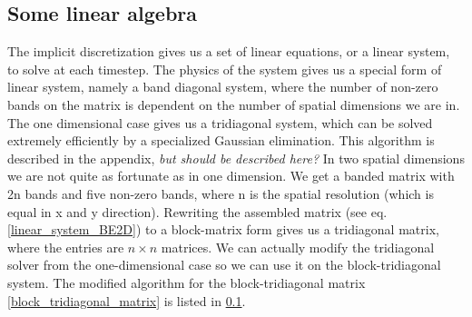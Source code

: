 \subsection{Some linear algebra}
The implicit discretization gives us a set of linear equations, or a linear system, to solve at each timestep. 
The physics of the system gives us a special form of linear system, namely a band diagonal system, where the number of non-zero bands on the matrix is dependent on the number of spatial dimensions we are in. 
The one dimensional case gives us a tridiagonal system, which can be solved extremely efficiently by a specialized Gaussian elimination. This algorithm is described in the appendix, \emph{but should be described here?} 
In two spatial dimensions we are not quite as fortunate as in one dimension. We get a banded matrix with 2n bands and five non-zero bands, where n is the spatial resolution (which is equal in x and y direction). Rewriting the assembled matrix (see eq. \ref{linear_system_BE2D}) to a block-matrix form gives us a tridiagonal matrix, where the entries are $n\times n$ matrices. We can actually modify the tridiagonal solver from the one-dimensional case so we can use it on the block-tridiagonal system. 
The modified algorithm for the block-tridiagonal matrix \ref{block_tridiagonal_matrix} is listed in \ref{}.

